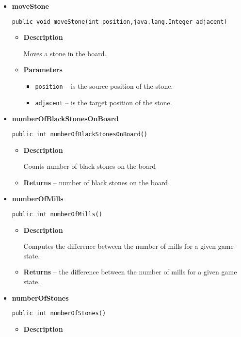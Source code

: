\documentclass[11pt,a4paper]{report}
\begin{document}
{{{{{{{{{{{\begin{itemize}
{\begin{itemize}
{Returns min possible value for estimations. Value returned by estimatedValue() must always be greater than this value. Useful for minimax and minimax alpha beta.
}
\item{{\bf  Returns} -- 
min possible value for estimations 
}%
\end{itemize}
}%
\item{ 
{\bf  moveStone}\\
\begin{lstlisting}[frame=none]
public void moveStone(int position,java.lang.Integer adjacent)\end{lstlisting} %
\begin{itemize}
\item{
{\bf  Description}

Moves a stone in the board.
}
\item{
{\bf  Parameters}
  \begin{itemize}
   \item{
\texttt{position} -- is the source position of the stone.}
   \item{
\texttt{adjacent} -- is the target position of the stone.}
  \end{itemize}
}%
\end{itemize}
}%
\item{ 
{\bf  numberOfBlackStonesOnBoard}\\
\begin{lstlisting}[frame=none]
public int numberOfBlackStonesOnBoard()\end{lstlisting} %
\begin{itemize}
\item{
{\bf  Description}

Counts number of black stones on the board
}
\item{{\bf  Returns} -- 
number of black stones on the board. 
}%
\end{itemize}
}%
\item{ 
{\bf  numberOfMills}\\
\begin{lstlisting}[frame=none]
public int numberOfMills()\end{lstlisting} %
\begin{itemize}
\item{
{\bf  Description}

Computes the difference between the number of mills for a given game state.
}
\item{{\bf  Returns} -- 
the difference between the number of mills for a given game state. 
}%
\end{itemize}
}%
\item{ 
{\bf  numberOfStones}\\
\begin{lstlisting}[frame=none]
public int numberOfStones()\end{lstlisting} %
\begin{itemize}
\item{
{\bf  Description}

}
\end{itemize}}
\end{itemize}}}}}}}}}}}}
\end{document}
